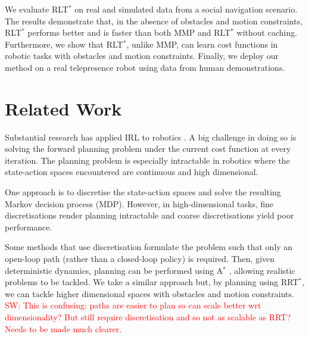 \documentclass{article}  %
\newcommand{\sw}[1]{\textcolor{red}{SW: #1}}
\begin{document}
We evaluate RLT$^*$ on real and simulated data from a social navigation scenario. The results demonstrate that, in the absence of obstacles and motion constraints, RLT$^*$ performs better and is faster than both MMP and RLT$^*$ without caching. Furthermore, we show that RLT$^*$, unlike MMP, can learn cost functions in robotic tasks with obstacles and motion constraints. Finally, we deploy our method on a real telepresence robot using data from human demonstrations.




\section{Related Work \label{sec:related_work}}


Substantial research has applied IRL to robotics \cite{henry2010learning,abbeel2008apprenticeship,vasquez2014inverse}.
A big challenge in doing so is solving the forward planning problem under the current cost function at every iteration. The planning problem is especially intractable in robotics where the state-action spaces encountered are continuous and high dimensional. %

One approach is to discretise the state-action spaces and solve the resulting Markov decision process (MDP). However, in high-dimensional tasks, fine discretisations render planning intractable and coarse discretisations yield poor performance.

Some methods that use discretisation formulate the problem such that only an open-loop path (rather than a closed-loop policy) is required. Then, given deterministic dynamics, planning can be performed using A$^*$ \cite{ratliff2006maximum}, allowing realistic problems to be tackled. We take a similar approach but, by planning using RRT$^*$, we can tackle higher dimensional spaces with obstacles and motion constraints. \sw{This is confusing: paths are easier to plan so can scale better wrt dimensionality?  But still require discretisation and so not as scalable as RRT?  Needs to be made much clearer.}
\end{document}
